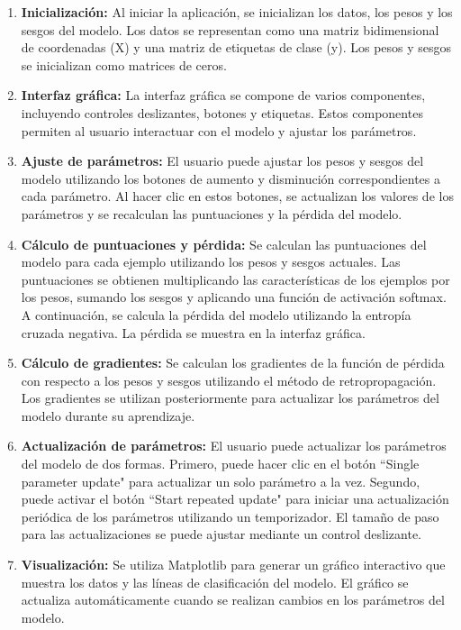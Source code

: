 \documentclass[twoside,10pt]{article}
\numberwithin{equation}{section}
\begin{document}
\begin{enumerate}
    \item \textbf{Inicialización:} Al iniciar la aplicación, se inicializan los datos, los pesos y los sesgos del modelo. Los datos se representan como una matriz bidimensional de coordenadas (X) y una matriz de etiquetas de clase (y). Los pesos y sesgos se inicializan como matrices de ceros.
    \item \textbf{Interfaz gráfica:} La interfaz gráfica se compone de varios componentes, incluyendo controles deslizantes, botones y etiquetas. Estos componentes permiten al usuario interactuar con el modelo y ajustar los parámetros.
    \item \textbf{Ajuste de parámetros:} El usuario puede ajustar los pesos y sesgos del modelo utilizando los botones de aumento y disminución correspondientes a cada parámetro. Al hacer clic en estos botones, se actualizan los valores de los parámetros y se recalculan las puntuaciones y la pérdida del modelo.
    \item \textbf{Cálculo de puntuaciones y pérdida:} Se calculan las puntuaciones del modelo para cada ejemplo utilizando los pesos y sesgos actuales. Las puntuaciones se obtienen multiplicando las características de los ejemplos por los pesos, sumando los sesgos y aplicando una función de activación softmax. A continuación, se calcula la pérdida del modelo utilizando la entropía cruzada negativa. La pérdida se muestra en la interfaz gráfica.
    \item \textbf{Cálculo de gradientes:} Se calculan los gradientes de la función de pérdida con respecto a los pesos y sesgos utilizando el método de retropropagación. Los gradientes se utilizan posteriormente para actualizar los parámetros del modelo durante su aprendizaje.
    \item \textbf{Actualización de parámetros:} El usuario puede actualizar los parámetros del modelo de dos formas. Primero, puede hacer clic en el botón ``Single parameter update" para actualizar un solo parámetro a la vez. Segundo, puede activar el botón ``Start repeated update" para iniciar una actualización periódica de los parámetros utilizando un temporizador. El tamaño de paso para las actualizaciones se puede ajustar mediante un control deslizante.
    \item \textbf{Visualización:} Se utiliza Matplotlib para generar un gráfico interactivo que muestra los datos y las líneas de clasificación del modelo. El gráfico se actualiza automáticamente cuando se realizan cambios en los parámetros del modelo.
\end{enumerate}
\end{document}
